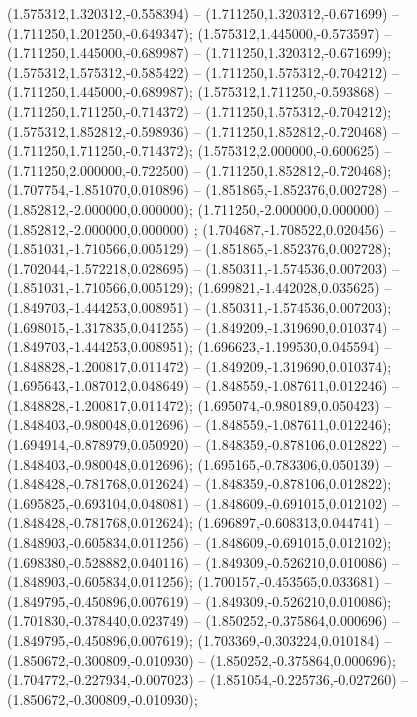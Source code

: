  (1.575312,1.320312,-0.558394) -- (1.711250,1.320312,-0.671699) -- (1.711250,1.201250,-0.649347);
 (1.575312,1.445000,-0.573597) -- (1.711250,1.445000,-0.689987) -- (1.711250,1.320312,-0.671699);
 (1.575312,1.575312,-0.585422) -- (1.711250,1.575312,-0.704212) -- (1.711250,1.445000,-0.689987);
 (1.575312,1.711250,-0.593868) -- (1.711250,1.711250,-0.714372) -- (1.711250,1.575312,-0.704212);
 (1.575312,1.852812,-0.598936) -- (1.711250,1.852812,-0.720468) -- (1.711250,1.711250,-0.714372);
 (1.575312,2.000000,-0.600625) -- (1.711250,2.000000,-0.722500) -- (1.711250,1.852812,-0.720468);
 (1.707754,-1.851070,0.010896) -- (1.851865,-1.852376,0.002728) -- (1.852812,-2.000000,0.000000);
 (1.711250,-2.000000,0.000000) -- (1.852812,-2.000000,0.000000) ;
 (1.704687,-1.708522,0.020456) -- (1.851031,-1.710566,0.005129) -- (1.851865,-1.852376,0.002728);
 (1.702044,-1.572218,0.028695) -- (1.850311,-1.574536,0.007203) -- (1.851031,-1.710566,0.005129);
 (1.699821,-1.442028,0.035625) -- (1.849703,-1.444253,0.008951) -- (1.850311,-1.574536,0.007203);
 (1.698015,-1.317835,0.041255) -- (1.849209,-1.319690,0.010374) -- (1.849703,-1.444253,0.008951);
 (1.696623,-1.199530,0.045594) -- (1.848828,-1.200817,0.011472) -- (1.849209,-1.319690,0.010374);
 (1.695643,-1.087012,0.048649) -- (1.848559,-1.087611,0.012246) -- (1.848828,-1.200817,0.011472);
 (1.695074,-0.980189,0.050423) -- (1.848403,-0.980048,0.012696) -- (1.848559,-1.087611,0.012246);
 (1.694914,-0.878979,0.050920) -- (1.848359,-0.878106,0.012822) -- (1.848403,-0.980048,0.012696);
 (1.695165,-0.783306,0.050139) -- (1.848428,-0.781768,0.012624) -- (1.848359,-0.878106,0.012822);
 (1.695825,-0.693104,0.048081) -- (1.848609,-0.691015,0.012102) -- (1.848428,-0.781768,0.012624);
 (1.696897,-0.608313,0.044741) -- (1.848903,-0.605834,0.011256) -- (1.848609,-0.691015,0.012102);
 (1.698380,-0.528882,0.040116) -- (1.849309,-0.526210,0.010086) -- (1.848903,-0.605834,0.011256);
 (1.700157,-0.453565,0.033681) -- (1.849795,-0.450896,0.007619) -- (1.849309,-0.526210,0.010086);
 (1.701830,-0.378440,0.023749) -- (1.850252,-0.375864,0.000696) -- (1.849795,-0.450896,0.007619);
 (1.703369,-0.303224,0.010184) -- (1.850672,-0.300809,-0.010930) -- (1.850252,-0.375864,0.000696);
 (1.704772,-0.227934,-0.007023) -- (1.851054,-0.225736,-0.027260) -- (1.850672,-0.300809,-0.010930);

